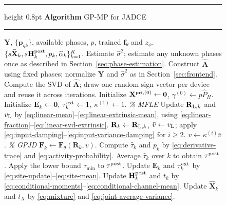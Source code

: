 \begin{figure}[!t]
\centering
\begin{minipage}{\linewidth}
\small
{}\label{alg:gp-mp-ccd}
\hrule height 0.8pt\vspace{3pt}
\textbf{Algorithm \thealgorithm}\enspace GP-MP for JADCE\par
\vspace{3pt}\hrule\vspace{3pt}
\begin{algorithmic}[1]
 \Require $\mathbf Y$, $\{\mathbf p_{qk}\}$, available phases, $p$, trained
 $\mathbf f_\theta$ and $z_\phi$.
 \Ensure $\{s\widehat{\mathbf X}_k,s\mathbf H_k^{\rm post},p_k,\widehat\alpha_k\}_{k=1}^K$.
 \State Estimate $\widehat\sigma^2$; estimate any unknown phases once as described in
 Section~\ref{sec:phase-estimation}.
 \State Construct $\widehat{\mathbf A}$ using fixed phases; normalize $\mathbf Y$ and $\widehat\sigma^2$ as in Section~\ref{sec:frontend}.
 \State Compute the SVD of $\widehat{\mathbf A}$; draw one random sign vector
 per device and reuse it across iterations.
 \State Initialize $\mathbf X^{{\rm pri},(0)}\gets\mathbf0$,
 $\gamma^{(0)}\gets p\widehat P_H$.
 \State Initialize $\mathbf E_k\gets\mathbf0$, $\tau_k^{\rm ext}\gets1$,
 $\kappa^{(1)}\gets1$.
  \Statex \hspace{\algorithmicindent}\textit{\% MFLE}
  \State Update $\mathbf R_{{\rm L},k}$ and $v_{\rm L}$ by
  \eqref{eq:linear-mean}--\eqref{eq:linear-extrinsic-mean}, using
  \eqref{eq:linear-fraction}--\eqref{eq:linear-svd-extrinsic}.
  \State $\mathbf R_k\gets\mathbf R_{{\rm L},k}$, $\bar v\gets v_{\rm L}$;
  apply \eqref{eq:input-damping}--\eqref{eq:input-variance-damping} for $i\geq2$.
  \State $v\gets\kappa^{(i)}\bar v$.
  \Statex \hspace{\algorithmicindent}\textit{\% GPJD}
  \State $\mathbf F_k\gets\mathbf F_\theta(\mathbf R_k,v)$.
  \State Compute $\widehat\tau_k$ and $p_k$ by \eqref{eq:derivative-trace}
  and \eqref{eq:activity-probability}.
  \State Average $\widehat\tau_k$ over $k$ to obtain $\tau^{\rm post}$.
  \State Apply the lower bound $\tau_{\min}$ to $\tau^{\rm post}$.
   \State Update $\mathbf E_k$ and $\tau_k^{\rm ext}$ by
   \eqref{eq:site-update}--\eqref{eq:site-mean}.
  \EndIf
  \State Update $\mathbf H_k^{\rm post}$ and $t_k$ by
  \eqref{eq:conditional-moments}--\eqref{eq:conditional-channel-mean}.
  \State Update $\widehat{\mathbf X}_k$ and $\overline t_X$ by
  \eqref{eq:mixture} and \eqref{eq:joint-average-variance}.

\end{algorithmic}
\end{minipage}
\end{figure}
